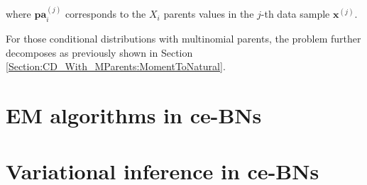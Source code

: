 \documentclass[11pt, oneside]{article}   	%
\newcommand{\bm}{\mathbf}
\numberwithin{figure}{section}
\numberwithin{equation}{section}
\numberwithin{table}{section}
\theoremstyle{definition}
\begin{document}
\noindent where $\bm{pa}^{(j)}_i$ corresponds to the $X_i$ parents values in the $j$-th data sample $\bm x^{(j)}$.

For those conditional distributions with multinomial parents, the problem further decomposes as previously shown in Section \ref{Section:CD_With_MParents:MomentToNatural}. 


%
%
%
%
%

\section{EM algorithms in ce-BNs}


\section{Variational inference in ce-BNs}
\end{document}
